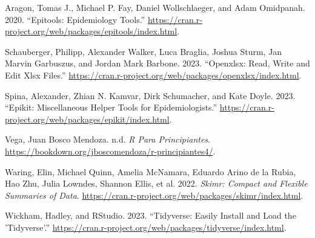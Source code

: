 \documentclass[
  letterpaper,
  DIV=11,
  numbers=noendperiod]{scrreprt}
\newlength{\cslhangindent}
\newenvironment{CSLReferences}[2] %
 {\begin{list}{}{%
  \setlength{\itemindent}{0pt}
  \setlength{\leftmargin}{0pt}
  \setlength{\parsep}{0pt}
  \ifodd #1
   \setlength{\leftmargin}{\cslhangindent}
   \setlength{\itemindent}{-1\cslhangindent}
  \fi
  \setlength{\itemsep}{#2\baselineskip}}}
 {\end{list}}
\begin{document}
\label{refs}
\begin{CSLReferences}{1}{0}
Aragon, Tomas J., Michael P. Fay, Daniel Wollschlaeger, and Adam
Omidpanah. 2020. {``Epitools: {Epidemiology} {Tools}.''}
\url{https://cran.r-project.org/web/packages/epitools/index.html}.

Schauberger, Philipp, Alexander Walker, Luca Braglia, Joshua Sturm, Jan
Marvin Garbuszus, and Jordan Mark Barbone. 2023. {``Openxlsx: {Read},
{Write} and {Edit} Xlsx {Files}.''}
\url{https://cran.r-project.org/web/packages/openxlsx/index.html}.

Spina, Alexander, Zhian N. Kamvar, Dirk Schumacher, and Kate Doyle.
2023. {``Epikit: {Miscellaneous} {Helper} {Tools} for
{Epidemiologists}.''}
\url{https://cran.r-project.org/web/packages/epikit/index.html}.

Vega, Juan Bosco Mendoza. n.d. \emph{R Para Principiantes}.
\url{https://bookdown.org/jboscomendoza/r-principiantes4/}.

Waring, Elin, Michael Quinn, Amelia McNamara, Eduardo Arino de la Rubia,
Hao Zhu, Julia Lowndes, Shannon Ellis, et al. 2022. \emph{Skimr: Compact
and Flexible Summaries of Data}.
\url{https://cran.r-project.org/web/packages/skimr/index.html}.

Wickham, Hadley, and RStudio. 2023. {``Tidyverse: {Easily} {Install} and
{Load} the '{Tidyverse}'.''}
\url{https://cran.r-project.org/web/packages/tidyverse/index.html}.

\end{CSLReferences}
\end{document}
